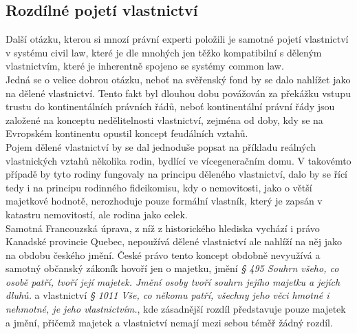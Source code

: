 \documentclass{article}
\begin{document}




\subsection{Rozdílné pojetí vlastnictví}

Další otázku, kterou si mnozí právní experti položili je samotné pojetí vlastnictví v systému civil law, které je dle mnohých jen těžko kompatibilní s děleným vlastnictvím, které je inherentně spojeno se systémy common law.\\


Jedná se o velice dobrou otázku, neboť na svěřenský fond by se dalo nahlížet jako na dělené vlastnictví. Tento fakt byl dlouhou dobu povážován za překážku vstupu trustu do kontinentálních právních řádů, neboť kontinentální právní řády jsou založené na konceptu nedělitelnosti vlastnictví, zejména od doby, kdy se na Evropském kontinentu opustil koncept feudálních vztahů.\\

Pojem dělené vlastnictví by se dal jednoduše popsat na příkladu reálných vlastnických vztahů několika rodin, bydlící ve vícegeneračním domu. V takovémto případě by tyto rodiny fungovaly na principu děleného vlastnictví, dalo by se řící tedy i na principu rodinného fideikomisu, kdy o nemovitosti, jako o větší majetkové hodnotě, nerozhoduje pouze formální vlastník, který je zapsán v katastru nemovitostí, ale rodina jako celek.\\

Samotná Francouzská úprava, z níž z historického hlediska vychází i právo Kanadské provincie Quebec, nepoužívá dělené vlastnictví ale nahlíží na něj jako na obdobu českého jmění. České právo tento koncept obdobně nevyužívá a samotný občanský zákoník hovoří jen o majetku, jmění \textit{§ 495 Souhrn všeho, co osobě patří, tvoří její majetek. Jmění osoby tvoří souhrn jejího majetku a jejích dluhů.} a vlastnictví \textit{§ 1011 Vše, co někomu patří, všechny jeho věci hmotné i nehmotné, je jeho vlastnictvím.}, kde zásadnější rozdíl představuje pouze majetek a jmění, přičemž majetek a vlastnictví nemají mezi sebou téměř žádný rozdíl.\\
\end{document}

